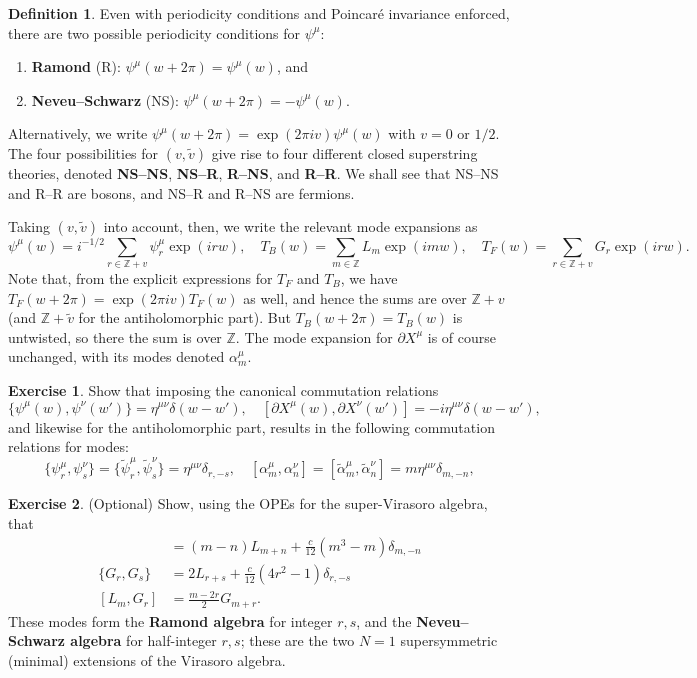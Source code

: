 \documentclass{report}
\theoremstyle{plain}
\theoremstyle{definition}
\newtheorem{definition}[theorem]{Definition}
\newtheorem{exercise}{Exercise}[section]
\theoremstyle{remark}
\newcommand{\di}{\partial}
\newcommand{\bZ}{\mathbb{Z}}
\begin{document}
\begin{definition}
  Even with periodicity conditions and Poincar\'e invariance enforced,
  there are two possible periodicity conditions for $\psi^\mu$:
  \begin{enumerate}
  \item {\bf Ramond} (R): $\psi^\mu(w + 2\pi) = \psi^\mu(w)$, and
  \item {\bf Neveu--Schwarz} (NS): $\psi^\mu(w + 2\pi) = -\psi^\mu(w)$.
  \end{enumerate}
  Alternatively, we write $\psi^\mu(w + 2\pi) = \exp(2\pi i v)
  \psi^\mu(w)$ with $v = 0$ or $1/2$. The four possibilities for $(v,
  \tilde{v})$ give rise to four different closed superstring theories,
  denoted {\bf NS--NS}, {\bf NS--R}, {\bf R--NS}, and {\bf R--R}. We
  shall see that NS--NS and R--R are bosons, and NS--R and R--NS are
  fermions.
\end{definition}

Taking $(v, \tilde{v})$ into account, then, we write the relevant mode
expansions as
\[ \psi^\mu(w) = i^{-1/2} \sum_{r \in \bZ + v} \psi_r^\mu \exp(irw), \quad T_B(w) = \sum_{m \in \bZ} L_m \exp(imw), \quad T_F(w) = \sum_{r \in \bZ + v} G_r \exp(irw). \]
Note that, from the explicit expressions for $T_F$ and $T_B$, we have
$T_F(w + 2\pi) = \exp(2\pi iv) T_F(w)$ as well, and hence the sums are
over $\bZ + v$ (and $\bZ + \tilde{v}$ for the antiholomorphic part).
But $T_B(w + 2\pi) = T_B(w)$ is untwisted, so there the sum is over
$\bZ$. The mode expansion for $\di X^\mu$ is of course unchanged, with
its modes denoted $\alpha^\mu_m$.

\begin{exercise}
  Show that imposing the canonical commutation relations
  \[ \{\psi^\mu(w), \psi^\nu(w')\} = \eta^{\mu\nu} \delta(w - w'), \quad [\di X^\mu(w), \di X^\nu(w')] = -i \eta^{\mu\nu} \delta(w - w'), \]
  and likewise for the antiholomorphic part, results in the following
  commutation relations for modes:
  \[ \{\psi^\mu_r, \psi^\nu_s\} = \{\tilde{\psi}^\mu_r, \tilde{\psi}^\nu_s\} = \eta^{\mu\nu} \delta_{r,-s}, \quad [\alpha^\mu_m, \alpha^\nu_n] = [\tilde{\alpha}^\mu_m, \tilde{\alpha}^\nu_n] = m\eta^{\mu\nu} \delta_{m,-n}, \]
\end{exercise}

\begin{exercise} (Optional)
  Show, using the OPEs for the super-Virasoro algebra, that
  \begin{align*}
    [L_m, L_n] &= (m - n) L_{m+n} + \frac{c}{12}(m^3 - m)\delta_{m,-n} \\
    \{G_r, G_s\} &= 2 L_{r+s} + \frac{c}{12} (4r^2 - 1) \delta_{r,-s} \\
    [L_m, G_r] &= \frac{m - 2r}{2} G_{m+r}.
  \end{align*}
  These modes form the {\bf Ramond algebra} for integer $r, s$, and
  the {\bf Neveu--Schwarz algebra} for half-integer $r, s$; these are
  the two $N = 1$ supersymmetric (minimal) extensions of the Virasoro
  algebra.
\end{exercise}
\end{document}

